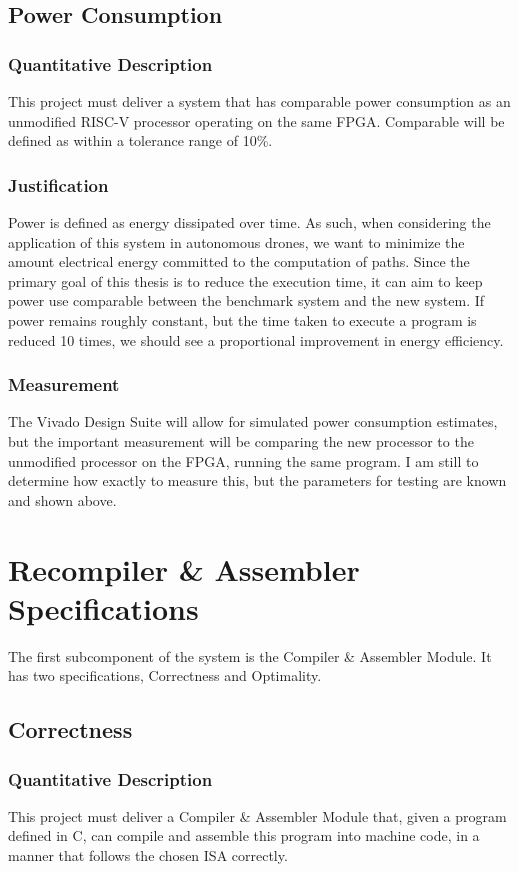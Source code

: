 \subsection{Power Consumption}
\subsubsection{Quantitative Description}
This project must deliver a system that has comparable power consumption as an unmodified RISC-V processor operating on the same FPGA. Comparable will be defined as within a tolerance range of 10\%.
\subsubsection{Justification}
Power is defined as energy dissipated over time.\cite{AmericanElectricianHandbook} As such, when considering the application of this system in autonomous drones, we want to minimize the amount electrical energy committed to the computation of paths. Since the primary goal of this thesis is to reduce the execution time, it can aim to keep power use comparable between the benchmark system and the new system. If power remains roughly constant, but the time taken to execute a program is reduced 10 times, we should see a proportional improvement in energy efficiency.
\subsubsection{Measurement}
The Vivado Design Suite\cite{Vivado} will allow for simulated power consumption estimates, but the important measurement will be comparing the new processor to the unmodified processor on the FPGA, running the same program. I am still to determine how exactly to measure this, but the parameters for testing are known and shown above.


\section{Recompiler \& Assembler Specifications}
The first subcomponent of the system is the Compiler \& Assembler Module. It has two specifications, Correctness and Optimality. 
\subsection{Correctness}
\subsubsection{Quantitative Description}
This project must deliver a Compiler \& Assembler Module that, given a program defined in C, can compile and assemble this program into machine code, in a manner that follows the chosen ISA correctly. 
